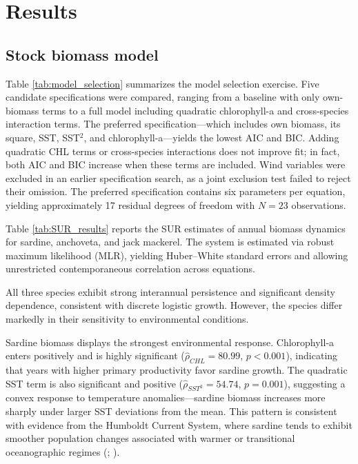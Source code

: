 \documentclass[
  11pt,
]{article}
\begin{document}
\section{Results}\label{results}

\subsection{Stock biomass model}\label{stock-biomass-model}

Table \ref{tab:model_selection} summarizes the model selection exercise. Five candidate specifications were compared, ranging from a baseline with only own-biomass terms to a full model including quadratic chlorophyll-a and cross-species interaction terms. The preferred specification---which includes own biomass, its square, SST, SST\(^2\), and chlorophyll-a---yields the lowest AIC and BIC. Adding quadratic CHL terms or cross-species interactions does not improve fit; in fact, both AIC and BIC increase when these terms are included. Wind variables were excluded in an earlier specification search, as a joint exclusion test failed to reject their omission. The preferred specification contains six parameters per equation, yielding approximately 17 residual degrees of freedom with \(N=23\) observations.

Table \ref{tab:SUR_results} reports the SUR estimates of annual biomass dynamics for sardine, anchoveta, and jack mackerel. The system is estimated via robust maximum likelihood (MLR), yielding Huber--White standard errors and allowing unrestricted contemporaneous correlation across equations.

All three species exhibit strong interannual persistence and significant density dependence, consistent with discrete logistic growth. However, the species differ markedly in their sensitivity to environmental conditions.

Sardine biomass displays the strongest environmental response. Chlorophyll-a enters positively and is highly significant (\(\hat{\rho}_{CHL} = 80.99\), \(p < 0.001\)), indicating that years with higher primary productivity favor sardine growth. The quadratic SST term is also significant and positive (\(\hat{\rho}_{SST^2} = 54.74\), \(p = 0.001\)), suggesting a convex response to temperature anomalies---sardine biomass increases more sharply under larger SST deviations from the mean. This pattern is consistent with evidence from the Humboldt Current System, where sardine tends to exhibit smoother population changes associated with warmer or transitional oceanographic regimes (; ).
\end{document}
